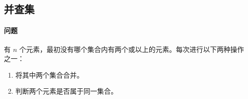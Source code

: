 \subsection{并查集}
	\paragraph{问题} 有 $n$ 个元素，最初没有哪个集合内有两个或以上的元素。每次进行以下两种操作之一：
	
	\begin{enumerate}
		\item 将其中两个集合合并。
		\item 判断两个元素是否属于同一集合。
	\end{enumerate}
	
	